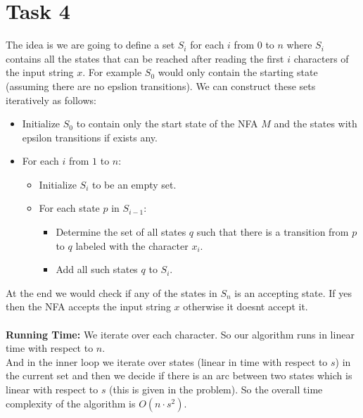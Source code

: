 \documentclass{article}
\begin{document}

\section*{Task 4}
The idea is we are going to define a set \(S_i\) for each \(i\) from \(0\) to \(n\) where \(S_i\) contains all the states that can be reached after reading the first \(i\) characters of the input string \(x\).
For example \(S_0\) would only contain the starting state (assuming there are no epslion transitions). We can construct these sets iteratively as follows:
\begin{itemize}
    \item Initialize \(S_0\) to contain only the start state of the NFA \(M\) and the states with epsilon transitions if exists any.
    \item For each \(i\) from \(1\) to \(n\):
    \begin{itemize}
        \item Initialize \(S_i\) to be an empty set.
        \item For each state \(p\) in \(S_{i-1}\):
        \begin{itemize}
            \item Determine the set of all states \(q\) such that there is a transition from \(p\) to \(q\) labeled with the character \(x_i\).
            \item Add all such states \(q\) to \(S_i\).
        \end{itemize}
    \end{itemize}
\end{itemize}

At the end we would check if any of the states in \(S_n\) is an accepting state. If yes then the NFA accepts the input string \(x\) otherwise it doesnt accept it.
\\
\\
\textbf{Running Time:}
We iterate over each character. So our algorithm runs in linear time with respect to \(n\).\\
And in the inner loop we iterate over states (linear in time with respect to \(s\)) in the current set and then we decide if there is an arc between two states
which is linear with respect to \(s\) (this is given in the problem). So the overall time complexity of the algorithm is \(O(n \cdot s^2)\).
\end{document}
